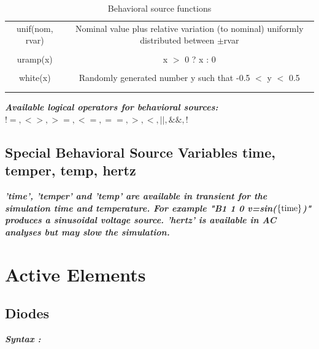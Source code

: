 \begin{longtable}{c c}
unif(nom, rvar) & \begin{minipage}{20em}
Nominal value plus relative variation (to nominal) uniformly distributed between $\pm$rvar
\end{minipage}\\ \\

uramp(x) & \begin{minipage}{20em}
x $>$ 0 ? x : 0
\end{minipage}\\ \\

white(x) & \begin{minipage}{20em}
Randomly generated number y such that -0.5 $<$ y $<$ 0.5
\end{minipage}\\ \\[1ex] %
\hline %

\caption{Behavioral source functions}
\label {tab:paramfuncs}
\end{longtable}

\textbf{\textit{Available logical operators for behavioral sources: $!=, <>, >=, <=, ==, >, <, ||, \&\&, !$ }}

\subsection{Special Behavioral Source Variables time, temper, temp, hertz}
\textbf{\textit{'time', 'temper' and 'temp' are available in transient for the simulation time and temperature. For example "B1 1 0 v=sin($\rm{\left\{time\right\}}$)" produces a sinusoidal voltage source. 'hertz' is available in AC analyses but may slow the simulation.}}

\newpage
\section{Active Elements}
\label{sec_sceadm_activeelements}

\subsection{Diodes}
\label{subsec_sceadm_diodes}

\textbf{\textit{Syntax :}}


